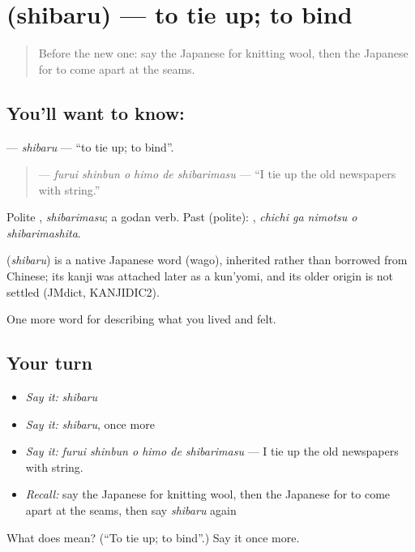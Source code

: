 \section[\texorpdfstring{\ja{しばる} (shibaru)}{しばる (shibaru)}]{ (shibaru) — to tie up; to bind}

\label{lesson:JA-C484-shibaru}



\begin{quote}
Before the new one: say the Japanese for knitting wool, then the Japanese for to come apart at the seams.
\end{quote}

\subsection*{You'll want to know: }
\textbf{} — \emph{shibaru} — \textquotedblleft{}to tie up; to bind\textquotedblright{}.

\begin{quote}
\textbf{   } — \emph{furui shinbun o himo de shibarimasu} — \textquotedblleft{}I tie up the old newspapers with string.\textquotedblright{}
\end{quote}

Polite \textbf{}, \emph{shibarimasu}; a godan verb. Past (polite): \textbf{  }, \emph{chichi ga nimotsu o shibarimashita}.

\begin{cousinweb}
\textbf{} (\emph{shibaru}) is a native Japanese word (wago), inherited rather than borrowed from Chinese; its kanji was attached later as a kun'yomi, and its older origin is not settled (JMdict, KANJIDIC2).
\end{cousinweb}

\begin{grammarlens}[title={What you've built}]
One more word for describing what you lived and felt.
\end{grammarlens}

\subsection*{Your turn}
\begin{itemize}
\raggedright
  \item \emph{Say it:} \emph{shibaru}
  \item \emph{Say it:} \emph{shibaru}, once more
  \item \emph{Say it:} \emph{furui shinbun o himo de shibarimasu} — I tie up the old newspapers with string.
  \item \emph{Recall:} say the Japanese for knitting wool, then the Japanese for to come apart at the seams, then say \emph{shibaru} again
\end{itemize}

\begin{tcolorbox}[breakable,colback=teal!4,colframe=teal!35!black,title={Before you move on}]
What does  mean? (\textquotedblleft{}To tie up; to bind\textquotedblright{}.) Say it once more.
\end{tcolorbox}

